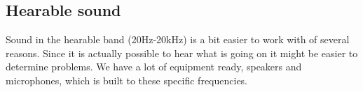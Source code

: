 \subsection{Hearable sound}
Sound in the hearable band (20Hz-20kHz) is a bit easier to work with of several reasons. Since it is actually possible to hear what is going on it might be easier to determine problems. We have a lot of equipment ready, speakers and microphones, which is built to these specific frequencies.